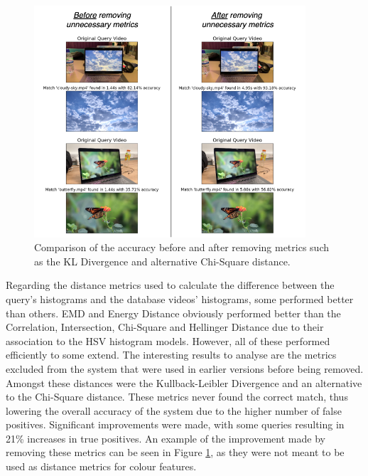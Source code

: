 \begin{figure}[h] 
\centerline{\includegraphics[width=0.9\textwidth]{figures/evaluation/comparison_before_after_removing_metrics.png}}
\caption{\label{fig:evaluation-comparison_before_after_removing_metrics}Comparison of the accuracy before and after removing metrics such as the KL Divergence and alternative Chi-Square distance.}
\end{figure}

Regarding the distance metrics used to calculate the difference between the query's histograms and the database videos' histograms, some performed better than others. EMD and Energy Distance obviously performed better than the Correlation, Intersection, Chi-Square and Hellinger Distance due to their association to the HSV histogram models. However, all of these performed efficiently to some extend. The interesting results to analyse are the metrics excluded from the system that were used in earlier versions before being removed. Amongst these distances were the Kullback-Leibler Divergence and an alternative to the Chi-Square distance. These metrics never found the correct match, thus lowering the overall accuracy of the system due to the higher number of false positives. Significant improvements were made, with some queries resulting in 21\% increases in true positives. An example of the improvement made by removing these metrics can be seen in Figure \ref{fig:evaluation-comparison_before_after_removing_metrics}, as they were not meant to be used as distance metrics for colour features. 


